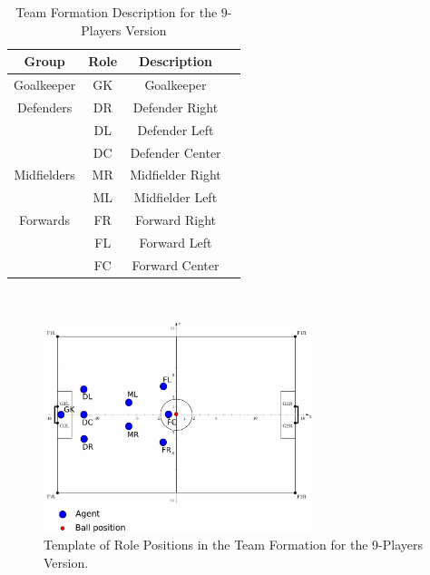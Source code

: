 \begin{table}[t!]
\caption{Team Formation Description for the 9-Players Version}
\label{TeamFormation9}
\begin{center}
    \begin{tabular}{cccc}
    \textbf{Group} 	 & \textbf{Role} & \textbf{Description}  \\
    \midrule
	Goalkeeper 		     & GK		& Goalkeeper  \\ 
    Defenders				& DR		& Defender Right			\\
     						& DL		& Defender Left		 	\\
    						& DC		& Defender Center			\\
    Midfielders 		    & MR		& Midfielder Right			\\
     						& ML		& Midfielder Left			\\
    Forwards  	    		& FR		& Forward Right		 	\\
     					& FL		& Forward Left		 	\\
     						& FC   	    & Forward Center		 
    \end{tabular}
\end{center}
\vspace*{-0.4cm}
\end{table}
~
\begin{figure}[t!]
\centering
  \includegraphics[width=0.7\textwidth]{Chapter4/figures/Formation9_0.pdf}
  \caption{Template of Role Positions in the Team Formation for the 9-Players Version.} 
  \label{fig:Formation9_0}
\end{figure}

